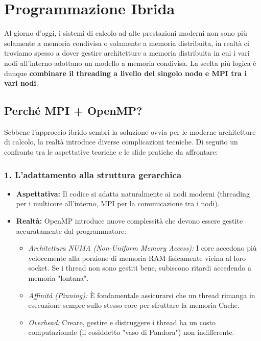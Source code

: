 \chapter{Programmazione Ibrida}
Al giorno d'oggi, i sistemi di calcolo ad alte prestazioni moderni non sono più solamente a memoria condivisa o solamente a memoria distribuita, in realtà ci troviamo spesso a dover gestire architetture a memoria distribuita in cui i vari nodi all'interno adottano un modello a memoria condivisa. La scelta più logica è dunque \textbf{combinare il threading a livello del singolo nodo e MPI tra i vari nodi}. 
\section{Perché MPI + OpenMP?}
Sebbene l'approccio ibrido sembri la soluzione ovvia per le moderne architetture di calcolo, la realtà introduce diverse complicazioni tecniche. Di seguito un confronto tra le aspettative teoriche e le sfide pratiche da affrontare:

\subsection*{1. L'adattamento alla struttura gerarchica}
\begin{itemize}
    \item \textbf{Aspettativa:} Il codice si adatta naturalmente ai nodi moderni (threading per i multicore all'interno, MPI per la comunicazione tra i nodi).
    \item \textbf{Realtà:} OpenMP introduce nuove complessità che devono essere gestite accuratamente dal programmatore:
    \begin{itemize}
        \item \textit{Architettura NUMA (Non-Uniform Memory Access):} I core accedono più velocemente alla porzione di memoria RAM fisicamente vicina al loro socket. Se i thread non sono gestiti bene, subiscono ritardi accedendo a memoria "lontana".
        \item \textit{Affinità (Pinning):} È fondamentale assicurarsi che un thread rimanga in esecuzione sempre sullo stesso core per sfruttare la memoria Cache.
        \item \textit{Overhead:} Creare, gestire e distruggere i thread ha un costo computazionale  (il cosiddetto "vaso di Pandora") non indifferente.
    \end{itemize}
\end{itemize}

